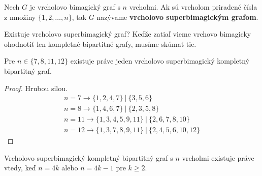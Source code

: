 \begin{definition} Nech $G$ je vrcholovo bimagický graf s $n$ vrcholmi. Ak sú vrcholom priradené čísla z množiny $\{1, 2, \dots , n\}$, tak $G$ nazývame \textbf{vrcholovo superbimagickým grafom}.
\end{definition} 

Existuje vrcholovo superbimagický graf? Keďže zatiaľ vieme vrchovo bimagicky ohodnotiť len kompletné bipartitné grafy, musíme skúmať tie.

\begin{theorem}
\label{vsbg1}
Pre $n \in \{7, 8, 11, 12\}$  existuje práve jeden vrcholovo superbimagický kompletný bipartitný graf.
\end{theorem}

\begin{proof} Hrubou silou.
\begin{gather*}
n = 7 \rightarrow \{1, 2, 4, 7\} ~|~ \{3, 5, 6\} \\
n = 8 \rightarrow \{1, 4, 6, 7\} ~|~ \{2, 3, 5, 8\} \\
n = 11 \rightarrow \{1, 3, 4, 5, 9, 11\} ~|~ \{2, 6, 7, 8, 10\} \\
n = 12 \rightarrow \{1, 3, 7, 8, 9, 11\} ~|~ \{2, 4, 5, 6, 10, 12\}
\end{gather*}
\end{proof}

\begin{theorem}
\label{vsbgkij}
Vrcholovo superbimagický kompletný bipartitný graf s $n$ vrcholmi existuje práve vtedy, keď $n = 4k$ alebo $n = 4k-1$ pre $k \geq 2$.
\end{theorem}

